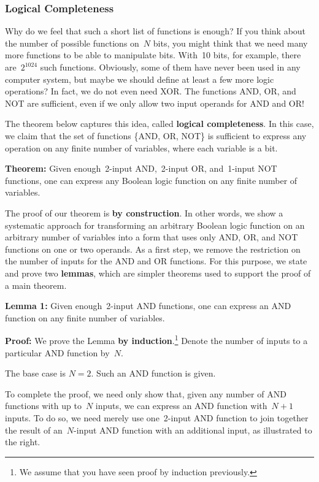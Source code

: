 \subsubsection{Logical Completeness}

Why do we feel that such a short list of functions is enough?  If you 
think about the
number of possible functions on~$N$ bits, you might think that we need
many more functions to be able to manipulate bits.  With~10 bits, for
example, there are~$2^{1024}$ such functions.  Obviously, some of them
have never been used in any computer system, but maybe we should define
at least a few more logic operations?
In fact, we do not
even need XOR.  The functions AND, OR, and NOT are sufficient, even if
we only allow two input operands for AND and OR!

The theorem below captures this idea, called {\bf logical completeness}.
In this case, we claim that the set of functions \{AND, OR, NOT\} is
sufficient to express any operation on any finite number of variables, 
where each variable is a bit.

{\bf Theorem:} 
%
Given enough~\mbox{2-input} AND,~\mbox{2-input} OR, and~\mbox{1-input}
NOT functions, one can express any Boolean logic function on any finite 
number of variables.

%
The proof of our theorem is {\bf by construction}.  In other words, 
we show a systematic
approach for transforming an arbitrary Boolean logic function on an
arbitrary number of variables into a form that uses only AND, OR, and
NOT functions on one or two operands.
%
As a first step, we remove the restriction on the number of inputs for
the AND and OR functions.  For this purpose, we state and prove two
{\bf lemmas}, which are simpler theorems used to support the proof of
a main theorem.

{\bf Lemma 1:}
%
Given enough~\mbox{2-input} AND functions, one can express an AND function
on any finite number of variables.

{\bf Proof:}
%
We prove the Lemma {\bf by induction}.\footnote{We assume that you have
seen proof by induction previously.}  Denote the number of inputs to a
particular AND function by~$N$.

\begin{minipage}{3.65in}
The base case is $N=2$.  Such an AND function is given.\mpline

To complete the proof, we need only show that, given 
any number of AND functions with up to~$N$ inputs, we
can express an AND function with~$N+1$ inputs.  To do so, we need
merely use one~\mbox{2-input} AND function to join together
the result of an~\mbox{$N$-input} AND function with an additional
input, as illustrated to the right.
\end{minipage}\hspace{.25in}%
\begin{minipage}{2.6in}
\end{minipage}

